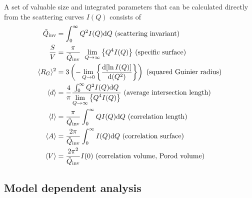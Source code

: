 A set of valuable size and integrated parameters that can be
calculated directly from the scattering curves $I(Q)$
\cite{Damaschun1969,Sjoberg1974,Damaschun1971,Walter1985,Moller1995,book:Guinier:Fournet}
consists of
\begin{subequations}
\begin{align}
\tilde{Q}_\text{inv} &= \int_0^\infty Q^2I(Q) \mathrm{d}Q \mbox{ (scattering invariant)} \\
\frac{S}{V} &= \frac{\pi}{\tilde{Q}_\text{inv}} \;\; {\DS\lim_{Q \to \infty}\left\{Q^4I(Q)\right\}} \mbox{ (specific surface)} \\
\langle R_G \rangle^2 &= 3\left(-\DS\lim_{Q \to 0}\left\{\frac{\mathrm{d}[\ln I(Q)]}{\mathrm{d}(Q^2)}\right\}\right) \mbox{ (squared Guinier radius)} \\
\langle d \rangle &= \frac{4}{\pi}\frac{\int_0^\infty Q^2I(Q) \mathrm{d}Q}{\DS\lim_{Q \to \infty}\left\{Q^4I(Q)\right\}} \mbox{ (average intersection length)} \\
\langle l \rangle &= \frac{\pi}{\tilde{Q}_\text{inv}} \int_0^\infty QI(Q) \mathrm{d}Q \mbox{ (correlation length)} \\
\langle A \rangle &= \frac{2\pi}{\tilde{Q}_\text{inv}}\int_0^\infty I(Q) \mathrm{d}Q \mbox{ (correlation surface)} \\
\langle V \rangle &= \frac{2\pi^2}{\tilde{Q}_\text{inv}} I(0) \mbox{ (correlation volume, Porod volume)}
\end{align}
\end{subequations}

\subsection{Model dependent analysis}
